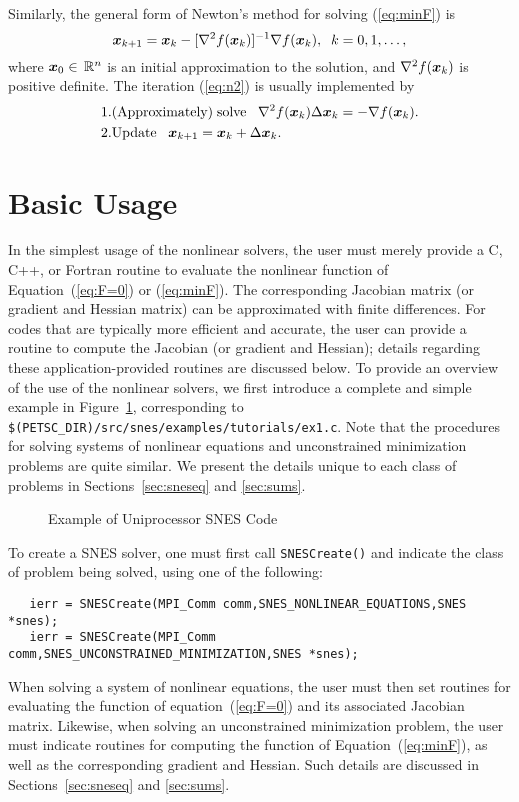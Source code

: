 Similarly, the general form of Newton's method for solving (\ref{eq:minF}) is
\begin{equation}
    \mbox{\boldmath \(x\)}_{k+1} = \mbox{\boldmath \(x\)}_k - [ \nabla^2 f(\mbox{\boldmath \(x\)}_k)]^{-1} \nabla f(\mbox{\boldmath \(x\)}_k), \;\;
          k=0,1, \ldots,
\label{eq:n2}
\end{equation}
where $ \mbox{\boldmath \(x\)}_0 \in \, \mathbb R^n $ is an initial approximation
to the solution, and $ \nabla^2 f(\mbox{\boldmath \(x\)}_k) $ is positive definite.
The iteration (\ref{eq:n2}) is usually implemented by
\begin{eqnarray}
  1. & {\rm (Approximately) \;solve\;\;\;} \nabla^2 f(\mbox{\boldmath \(x\)}_k) \Delta \mbox{\boldmath \(x\)}_k = -\nabla f(\mbox{\boldmath \(x\)}_k).\\
  2. & {\rm Update\;\;\;} \mbox{\boldmath \(x\)}_{k+1} = \mbox{\boldmath \(x\)}_k + \Delta \mbox{\boldmath \(x\)}_k. \hspace{.325in}
\end{eqnarray}

\section{Basic Usage}
\label{sec:snesusage}

In the simplest usage of the nonlinear solvers, the user must merely 
provide a C, C++, or Fortran routine to evaluate the nonlinear function 
of Equation~(\ref{eq:F=0}) or (\ref{eq:minF}).
The corresponding Jacobian  matrix 
(or gradient  and Hessian  matrix) 
can be approximated with finite differences.
For codes that are typically more efficient and accurate, the
user can provide a routine to compute the Jacobian (or gradient 
and Hessian); details regarding these application-provided 
routines are discussed below.  
To provide an overview of the use of the nonlinear solvers,
we first introduce a complete and simple example in
Figure~\ref{fig:snesexample}, corresponding to 
{\tt \$(PETSC\_DIR)/src/snes/examples/tutorials/ex1.c}.  
Note that the procedures for solving systems
of nonlinear equations and unconstrained minimization problems
are quite similar.  We present the details unique to each class of 
problems in Sections~\ref{sec:sneseq} and \ref{sec:sums}.

\begin{figure}[H]
{\small
{}
}
\caption{Example of Uniprocessor SNES Code}
\label{fig:snesexample}
\end{figure}

To create a SNES solver, one must first call {\tt SNESCreate()} and indicate
the class of problem being solved, using one of the following:
\begin{verbatim}
   ierr = SNESCreate(MPI_Comm comm,SNES_NONLINEAR_EQUATIONS,SNES *snes);
   ierr = SNESCreate(MPI_Comm comm,SNES_UNCONSTRAINED_MINIMIZATION,SNES *snes);
\end{verbatim}
When solving a system of nonlinear equations, the user must then set
routines for evaluating the function of equation~(\ref{eq:F=0}) and its
associated Jacobian matrix.  Likewise, when solving an unconstrained
minimization problem, the user must indicate routines for computing
the function of Equation~(\ref{eq:minF}), as well as the corresponding
gradient and Hessian. Such details are discussed in 
Sections~\ref{sec:sneseq} and \ref{sec:sums}.


